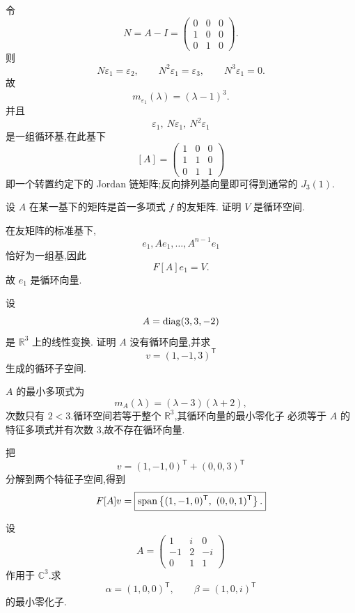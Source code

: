 \begin{solution}
令
\[
N=A-I=
\begin{pmatrix}
0&0&0\\
1&0&0\\
0&1&0
\end{pmatrix}.
\]
则
\[
N\varepsilon_1=\varepsilon_2,\qquad
N^2\varepsilon_1=\varepsilon_3,\qquad
N^3\varepsilon_1=0.
\]
故
\[
\boxed{m_{\varepsilon_1}(\lambda)=(\lambda-1)^3}.
\]
并且
\[
\varepsilon_1,\ N\varepsilon_1,\ N^2\varepsilon_1
\]
是一组循环基,在此基下
\[
[A]
=
\boxed{
\begin{pmatrix}
1&0&0\\
1&1&0\\
0&1&1
\end{pmatrix}
}
\]
即一个转置约定下的 Jordan 链矩阵;反向排列基向量即可得到通常的
$J_3(1)$.
\end{solution}


\begin{example}[\markstar]
设 $A$ 在某一基下的矩阵是首一多项式 $f$ 的友矩阵.
证明 $V$ 是循环空间.
\end{example}
\exampleblank

\begin{solution}
在友矩阵的标准基下,
\[
e_1,Ae_1,\ldots,A^{n-1}e_1
\]
恰好为一组基,因此
\[
F[A]e_1=V.
\]
故 $e_1$ 是循环向量.
\end{solution}


\begin{example}
设
\[
A=\operatorname{diag}(3,3,-2)
\]
是 $\mathbb{R}^3$ 上的线性变换.
证明 $A$ 没有循环向量,并求
\[
v=(1,-1,3)^{\mathsf T}
\]
生成的循环子空间.
\end{example}
\exampleblank

\begin{solution}
$A$ 的最小多项式为
\[
m_A(\lambda)=(\lambda-3)(\lambda+2),
\]
次数只有 $2<3$.循环空间若等于整个 $\mathbb{R}^3$,其循环向量的最小零化子
必须等于 $A$ 的特征多项式并有次数 $3$,故不存在循环向量.

把
\[
v=(1,-1,0)^{\mathsf T}+(0,0,3)^{\mathsf T}
\]
分解到两个特征子空间,得到
\[
F[A]v
=
\boxed{
\operatorname{span}\left\{
(1,-1,0)^{\mathsf T},\ (0,0,1)^{\mathsf T}
\right\}.
}
\]
\end{solution}


\begin{example}
设
\[
A=
\begin{pmatrix}
1&i&0\\
-1&2&-i\\
0&1&1
\end{pmatrix}
\]
作用于 $\mathbb{C}^3$.求
\[
\alpha=(1,0,0)^{\mathsf T},
\qquad
\beta=(1,0,i)^{\mathsf T}
\]
的最小零化子.
\end{example}
\exampleblank


